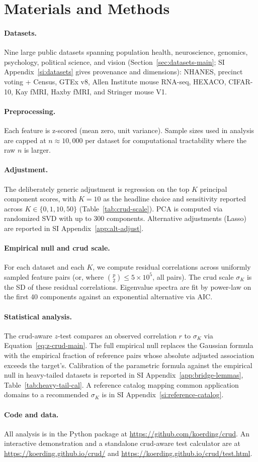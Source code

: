 \section*{Materials and Methods}

\paragraph{Datasets.} Nine large public datasets spanning population health, neuroscience, genomics, psychology, political science, and vision (Section~\ref{sec:datasets-main}; SI Appendix~\ref{si:datasets} gives provenance and dimensions): NHANES, precinct voting + Census, GTEx v8, Allen Institute mouse RNA-seq, HEXACO, CIFAR-10, Kay fMRI, Haxby fMRI, and Stringer mouse V1.

\paragraph{Preprocessing.} Each feature is z-scored (mean zero, unit variance). Sample sizes used in analysis are capped at $n\approx 10{,}000$ per dataset for computational tractability where the raw $n$ is larger.

\paragraph{Adjustment.} The deliberately generic adjustment is regression on the top $K$ principal component scores, with $K=10$ as the headline choice and sensitivity reported across $K\in\{0,1,10,50\}$ (Table~\ref{tab:crud-scale}). PCA is computed via randomized SVD with up to $300$ components. Alternative adjustments (Lasso) are reported in SI Appendix~\ref{app:alt-adjust}.

\paragraph{Empirical null and crud scale.} For each dataset and each $K$, we compute residual correlations across uniformly sampled feature pairs (or, where $\binom{p}{2}\le 5\times 10^5$, all pairs). The crud scale $\sigma_K$ is the SD of these residual correlations. Eigenvalue spectra are fit by power-law on the first 40 components against an exponential alternative via AIC.

\paragraph{Statistical analysis.} The crud-aware $z$-test compares an observed correlation $r$ to $\sigma_K$ via Equation~\eqref{eq:z-crud-main}. The full empirical null replaces the Gaussian formula with the empirical fraction of reference pairs whose absolute adjusted association exceeds the target's. Calibration of the parametric formula against the empirical null in heavy-tailed datasets is reported in SI Appendix~\ref{app:bridge-lemmas}, Table~\ref{tab:heavy-tail-cal}. A reference catalog mapping common application domains to a recommended $\sigma_K$ is in SI Appendix~\ref{si:reference-catalog}.

\paragraph{Code and data.} All analysis is in the Python package at \url{https://github.com/koerding/crud}. An interactive demonstration and a standalone crud-aware test calculator are at \url{https://koerding.github.io/crud/} and \url{https://koerding.github.io/crud/test.html}.
